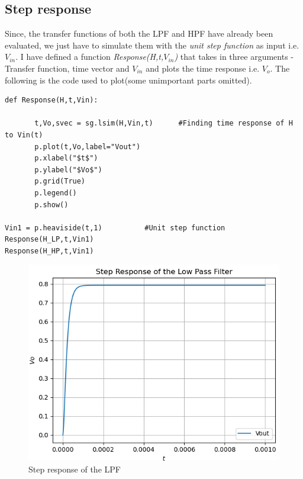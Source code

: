 \documentclass[11pt, a4paper]{article}
\begin{document}
\subsection{Step response}
    Since, the transfer functions of both the LPF and HPF have already been evaluated, we just have to simulate them with the \textit{unit step function} as input i.e. $V_{in}$. I have defined a function \textit{Response(H,t,$V_{in}$)} that takes in three arguments - Transfer function, time vector and $V_{in}$ and plots the time response i.e. $V_o$. The following is the code used to plot(some unimportant parts omitted).
    \begin{verbatim}
def Response(H,t,Vin):
    
       t,Vo,svec = sg.lsim(H,Vin,t)      #Finding time response of H to Vin(t) 
       p.plot(t,Vo,label="Vout")
       p.xlabel("$t$")
       p.ylabel("$Vo$")
       p.grid(True)
       p.legend()
       p.show()

Vin1 = p.heaviside(t,1)          #Unit step function
Response(H_LP,t,Vin1)
Response(H_HP,t,Vin1)
    \end{verbatim}
    \begin{figure}[!h]
        \centering
        \includegraphics[scale = 0.65]{Figure 3.png}
        \caption{Step response of the LPF}
        \label{fig:Figure 3}
    \end{figure}
\end{document}

